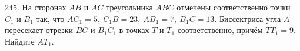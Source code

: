 245. На сторонах $AB$ и $AC$ треугольника $ABC$ отмечены соответственно точки $C_1$ и $B_1$ так, что $AC_1=5,\
C_1B=23,\ AB_1=7,\ B_1C=13.$ Биссектриса угла $A$ пересекает отрезки $BC$ и $B_1C_1$ в точках $T$ и $T_1$ соответственно, причём
$TT_1=9.$ Найдите $AT_1.$\\
